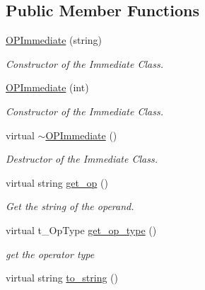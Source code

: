 \subsection*{Public Member Functions}
\begin{DoxyCompactItemize}
\item 
\mbox{\label{class_o_p_immediate_ab047dac5f3390947a21e4ab118c05857}} 
\mbox{\hyperlink{class_o_p_immediate_ab047dac5f3390947a21e4ab118c05857}{O\+P\+Immediate}} (string)
\begin{DoxyCompactList}\small\item\em Constructor of the Immediate Class. \end{DoxyCompactList}\item 
\mbox{\label{class_o_p_immediate_ae940dcf9e9050227a94c759a0cae6861}} 
\mbox{\hyperlink{class_o_p_immediate_ae940dcf9e9050227a94c759a0cae6861}{O\+P\+Immediate}} (int)
\begin{DoxyCompactList}\small\item\em Constructor of the Immediate Class. \end{DoxyCompactList}\item 
\mbox{\label{class_o_p_immediate_af7f51ae61e075e02817d6ecd7441408f}} 
virtual \mbox{\hyperlink{class_o_p_immediate_af7f51ae61e075e02817d6ecd7441408f}{$\sim$\+O\+P\+Immediate}} ()
\begin{DoxyCompactList}\small\item\em Destructor of the Immediate Class. \end{DoxyCompactList}\item 
virtual string \mbox{\hyperlink{class_o_p_immediate_ad714fb614c0d8f4afa1157a34b2936fd}{get\+\_\+op}} ()
\begin{DoxyCompactList}\small\item\em Get the string of the operand. \end{DoxyCompactList}\item 
virtual t\+\_\+\+Op\+Type \mbox{\hyperlink{class_o_p_immediate_aed01353798ae57936a9f77dd05eafa88}{get\+\_\+op\+\_\+type}} ()
\begin{DoxyCompactList}\small\item\em get the operator type \end{DoxyCompactList}\item 
virtual string \mbox{\hyperlink{class_o_p_immediate_a12bc613de3bff73ead8632dafd8050a0}{to\+\_\+string}} ()

\end{DoxyCompactItemize}
